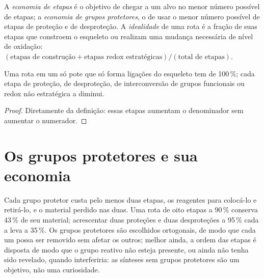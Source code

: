 \begin{definition}\label{def:b3:total-synthesis:economy}
A \emph{economia de etapas} é o objetivo de chegar a um alvo no
menor número possível de etapas; a \emph{economia de grupos protetores},
o de usar o menor número possível de etapas de proteção e de desproteção. A
\emph{idealidade} de uma rota é a fração de suas etapas que
constroem o esqueleto ou realizam uma mudança necessária de nível de oxidação:
$(\text{etapas de construção} + \text{etapas redox estratégicas})/(\text{total de etapas})$.
\end{definition}

\begin{proposition}\label{prop:b3:total-synthesis:ideality}
Uma rota em um só pote que só forma ligações do esqueleto tem  de 100\,\%; cada etapa de proteção,
de desproteção, de interconversão de grupos funcionais ou redox não estratégica
a diminui.
\end{proposition}

\begin{proof}
Diretamente da definição: essas etapas aumentam o denominador sem aumentar
o numerador.
\end{proof}

\section{Os grupos protetores e sua economia}

Cada grupo protetor custa pelo menos duas etapas, os reagentes para colocá-lo e
retirá-lo, e o material perdido nas duas. Uma rota de oito etapas a 90\,\% conserva
43\,\% de seu material; acrescentar duas proteções e duas desproteções a 95\,\% cada
a leva a 35\,\%. Os grupos protetores são escolhidos ortogonais, de modo que cada um possa ser
removido sem afetar os outros; melhor ainda, a ordem das etapas é
disposta de modo que o grupo reativo não esteja presente, ou ainda não tenha sido revelado, quando
interferiria: as sínteses sem grupos protetores são um objetivo, não uma curiosidade.

